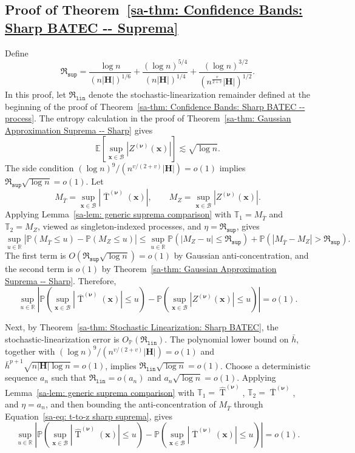\documentclass[10pt]{article}
\DeclareMathOperator{\Tstat}{T}
\renewcommand{\P}{\mathbb{P}}
\newcommand{\E}{\mathbb{E}}
\newcommand{\reals}{\mathbb{R}}
\newcommand{\bH}{\mathbf{H}}
\newcommand{\bx}{\mathbf{x}}
\newcommand{\bnu}{\boldsymbol{\nu}}
\newcommand{\B}{\mathcal{B}}
\begin{document}
\subsection{Proof of Theorem~\ref{sa-thm: Confidence Bands: Sharp BATEC -- Suprema}}
Define
\begin{equation*}
    \mathfrak{R}_{\mathtt{sup}}
    =
    \frac{\log n}{(n|\bH|)^{1/6}}
    +\frac{(\log n)^{5/4}}{(n|\bH|)^{1/4}}
    +\frac{(\log n)^{3/2}}{(n^{\frac{v}{2+v}}|\bH|)^{1/2}}.
\end{equation*}
In this proof, let $\mathfrak{R}_{\mathtt{lin}}$ denote the stochastic-linearization remainder defined at the beginning of the proof of Theorem~\ref{sa-thm: Confidence Bands: Sharp BATEC -- process}.
The entropy calculation in the proof of Theorem~\ref{sa-thm: Gaussian Approximation Suprema -- Sharp} gives
\[
    \E\left[\sup_{\bx\in\B}|Z^{(\bnu)}(\bx)|\right]\lesssim\sqrt{\log n}.
\]
The side condition $(\log n)^9/(n^{v/(2+v)}|\bH|)=o(1)$ implies $\mathfrak{R}_{\mathtt{sup}}\sqrt{\log n}=o(1)$. Let
\[
    M_{\overline T}=\sup_{\bx\in\B}|\overline{\Tstat}^{(\bnu)}(\bx)|,
    \qquad
    M_Z=\sup_{\bx\in\B}|Z^{(\bnu)}(\bx)|.
\]
Applying Lemma~\ref{sa-lem: generic suprema comparison} with $\mathbb{T}_1=M_{\overline T}$ and $\mathbb{T}_2=M_Z$, viewed as singleton-indexed processes, and $\eta=\mathfrak{R}_{\mathtt{sup}}$, gives
\[
    \sup_{u\in\reals}\left|\P(M_{\overline T}\le u)-\P(M_Z\le u)\right|
    \le
    \sup_{u\in\reals}\P(|M_Z-u|\le \mathfrak{R}_{\mathtt{sup}})
    +\P(|M_{\overline T}-M_Z|>\mathfrak{R}_{\mathtt{sup}}).
\]
The first term is $O(\mathfrak{R}_{\mathtt{sup}}\sqrt{\log n})=o(1)$ by Gaussian anti-concentration, and the second term is $o(1)$ by Theorem~\ref{sa-thm: Gaussian Approximation Suprema -- Sharp}. Therefore,
\begin{equation}\label{sa-eq: t-to-z sharp suprema}
    \sup_{u\in\reals}
    \left|
    \P\left(\sup_{\bx\in\B}|\overline{\Tstat}^{(\bnu)}(\bx)|\leq u\right)
    -
    \P\left(\sup_{\bx\in\B}|Z^{(\bnu)}(\bx)|\leq u\right)
    \right|
    =o(1).
\end{equation}

Next, by Theorem~\ref{sa-thm: Stochastic Linearization: Sharp BATEC}, the stochastic-linearization error is $O_{\P}(\mathfrak{R}_{\mathtt{lin}})$. The polynomial lower bound on $\bar h$, together with $(\log n)^9/(n^{v/(2+v)}|\bH|)=o(1)$ and $\bar h^{p+1}\sqrt{n|\bH|\log n}=o(1)$, implies $\mathfrak{R}_{\mathtt{lin}}\sqrt{\log n}=o(1)$. Choose a deterministic sequence $a_n$ such that $\mathfrak{R}_{\mathtt{lin}}=o(a_n)$ and $a_n\sqrt{\log n}=o(1)$. Applying Lemma~\ref{sa-lem: generic suprema comparison} with $\mathbb{T}_1=\widehat{\Tstat}^{(\bnu)}$, $\mathbb{T}_2=\overline{\Tstat}^{(\bnu)}$, and $\eta=a_n$, and then bounding the anti-concentration of $M_{\overline T}$ through Equation~\eqref{sa-eq: t-to-z sharp suprema}, gives
\begin{equation}\label{sa-eq: t-to-t sharp suprema}
    \sup_{u\in\reals}
    \left|
    \P\left(\sup_{\bx\in\B}|\widehat{\Tstat}^{(\bnu)}(\bx)|\leq u\right)
    -
    \P\left(\sup_{\bx\in\B}|\overline{\Tstat}^{(\bnu)}(\bx)|\leq u\right)
    \right|
    =o(1).
\end{equation}
\end{document}
